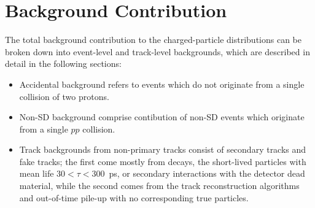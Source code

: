 \chapter{Background Contribution}\label{section:star_background}
The total background contribution to the charged-particle distributions can be broken down into
event-level and track-level backgrounds, which are described in detail in the following sections:
\begin{itemize}
	\item Accidental background refers to events which do not originate from a single collision of two protons.
	\item Non-SD background comprise contibution of non-SD events which originate from a single $pp$ collision.
	\item Track backgrounds from non-primary tracks consist of secondary tracks and fake tracks; the first come mostly from decays, the short-lived particles with mean life $30 < \tau < 300$~ps, or secondary interactions with the detector dead material, while the second comes from the track reconstruction algorithms and out-of-time pile-up with
	no corresponding true particles.
\end{itemize}


